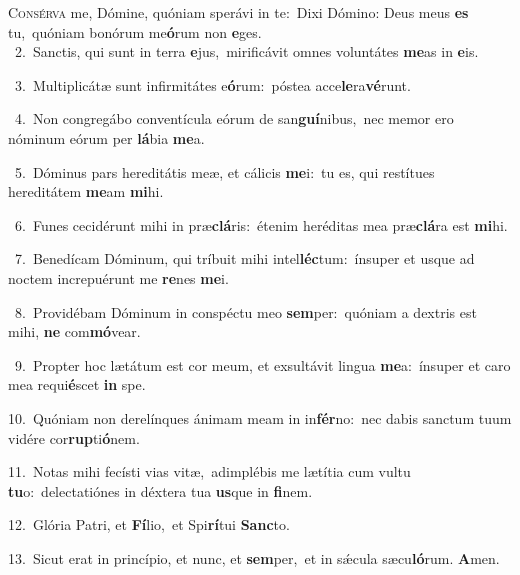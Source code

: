 \lettrine{\initial\textcolor{\initialcolor}{C}}{onsérva} me, Dómine, quóniam sperávi in te:~\dagger Dixi Dómino: Deus meus \textbf{es} tu,~\star quóniam bonórum me\-\textbf{ó}\-rum non \textbf{e}\-ges.\\
{\numbfont\textcolor{\numbcolor}{~2.}}~Sanctis, qui sunt in terra \textbf{e}\-jus,~\star mirificávit omnes voluntátes \textbf{me}\-as in \textbf{e}\-is.\par
{\numbfont\textcolor{\numbcolor}{~3.}}~Multiplicátæ sunt infirmitátes e\-\textbf{ó}\-rum:~\star póstea acce\-\textbf{le}\-ra\-\textbf{vé}\-runt.\par
{\numbfont\textcolor{\numbcolor}{~4.}}~Non congregábo conventícula eórum de san\-\textbf{guí}\-nibus,~\star nec memor ero nóminum eórum per \textbf{lá}\-bia \textbf{me}\-a.\par
{\numbfont\textcolor{\numbcolor}{~5.}}~Dóminus pars hereditátis meæ, et cálicis \textbf{me}\-i:~\star tu es, qui restítues hereditátem \textbf{me}\-am \textbf{mi}\-hi.\par
{\numbfont\textcolor{\numbcolor}{~6.}}~Funes cecidérunt mihi in præ\-\textbf{clá}\-ris:~\star étenim heréditas mea præ\-\textbf{clá}\-ra est \textbf{mi}\-hi.\par
{\numbfont\textcolor{\numbcolor}{~7.}}~Benedícam Dóminum, qui tríbuit mihi intel\-\textbf{léc}\-tum:~\star ínsuper et usque ad noctem increpuérunt me \textbf{re}\-nes \textbf{me}\-i.\par
{\numbfont\textcolor{\numbcolor}{~8.}}~Providébam Dóminum in conspéctu meo \textbf{sem}\-per:~\star quóniam a dextris est mihi, \textbf{ne} com\-\textbf{mó}\-vear.\par
{\numbfont\textcolor{\numbcolor}{~9.}}~Propter hoc lætátum est cor meum, et exsultávit lingua \textbf{me}\-a:~\star ínsuper et caro mea requi\-\textbf{é}\-scet \textbf{in} spe.\par
{\numbfont\textcolor{\numbcolor}{10.}}~Quóniam non derelínques ánimam meam in in\-\textbf{fér}\-no:~\star nec dabis sanctum tuum vidére cor\-\textbf{rup}\-ti\-\textbf{ó}\-nem.\par
{\numbfont\textcolor{\numbcolor}{11.}}~Notas mihi fecísti vias vitæ,~\dagger adimplébis me lætítia cum vultu \textbf{tu}\-o:~\star delectatiónes in déxtera tua \textbf{us}\-que in \textbf{fi}\-nem.\par
{\numbfont\textcolor{\numbcolor}{12.}}~Glória Patri, et \textbf{Fí}\-lio,~\star et Spi\-\textbf{rí}\-tui \textbf{Sanc}\-to.\par
{\numbfont\textcolor{\numbcolor}{13.}}~Sicut erat in princípio, et nunc, et \textbf{sem}\-per,~\star et in sǽcula sæcu\-\textbf{ló}\-rum. \textbf{A}\-men.\par
